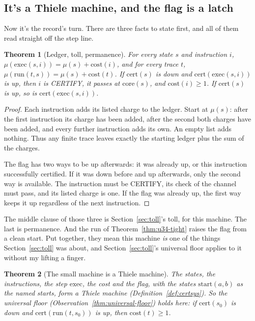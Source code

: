\documentclass[11pt,twoside]{article}
\theoremstyle{thielethm}
\newtheorem{theorem}{Theorem}[section]
\theoremstyle{thieledef}
\theoremstyle{thieledef}
\theoremstyle{thieledef}
\theoremstyle{thielethm}
\theoremstyle{thieleobs}
\theoremstyle{thielethm}
\begin{document}
\subsection{It's a Thiele machine, and the flag is a latch}

Now it's the record's turn. There are three facts to state first, and all of them read straight off the step line.

\begin{theorem}[Ledger, toll, permanence]\label{thm:u34-toll}
For every state $s$ and instruction $i$, $\mu(\mathrm{exec}(s, i)) = \mu(s) +
\mathrm{cost}(i)$, and for every trace $t$, $\mu(\mathrm{run}(t, s)) = \mu(s) +
\mathrm{cost}(t)$. If $\mathrm{cert}(s)$ is down and $\mathrm{cert}(\mathrm{exec}(s, i))$ is
up, then $i$ is CERTIFY, it passes at $\mathrm{core}(s)$, and $\mathrm{cost}(i) \ge 1$. If
$\mathrm{cert}(s)$ is up, so is $\mathrm{cert}(\mathrm{exec}(s, i))$.
\end{theorem}

\begin{proof}
Each instruction adds its listed charge to the ledger. Start at $\mu(s)$:
after the first instruction its charge has been added, after the second
both charges have been added, and every further instruction adds its own.
An empty list adds nothing. Thus any finite trace leaves exactly the
starting ledger plus the sum of the charges.

The flag has two ways to be up afterwards: it was already up, or this
instruction successfully certified. If it was down before and up afterwards,
only the second way is available. The instruction must be CERTIFY, its
check of the channel must pass, and its listed charge is one. If the flag
was already up, the first way keeps it up regardless of the next instruction.
\end{proof}

The middle clause of those three is Section~\ref{sec:toll}'s toll, for this machine. The last is
permanence. And the run of Theorem~\ref{thm:u34-tight} raises the flag from a clean start. Put
together, they mean this machine \emph{is}
one of the things Section~\ref{sec:toll} was about, and Section~\ref{sec:toll}'s universal floor applies to it without my lifting a finger.

\begin{theorem}[The small machine is a Thiele machine]\label{thm:u34-instance}
The states, the instructions, the step $\mathrm{exec}$, the cost and the flag, with the
states $\mathrm{start}(a, b)$ as the named starts, form a Thiele machine
(Definition~\ref{def:certsys}). So
the universal floor (Observation~\ref{thm:universal-floor}) holds here: if
$\mathrm{cert}(s_0)$ is down and $\mathrm{cert}(\mathrm{run}(t, s_0))$ is up, then
$\mathrm{cost}(t) \ge 1$.
\end{theorem}
\end{document}
